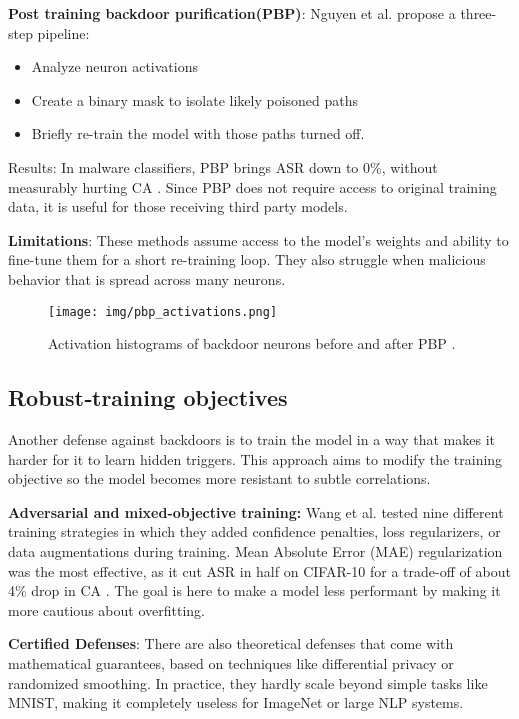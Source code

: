 \documentclass[sigconf,authorversion,nonacm,balance=false]{acmart}
\begin{document}
\textbf{Post training backdoor purification(PBP)}: Nguyen et al.\cite{defense_malware_nguyen_2025} propose a three-step pipeline:
\begin{itemize}
    \item Analyze neuron activations
    \item Create a binary mask to isolate likely poisoned paths
    \item Briefly re-train the model with those paths turned off. 
\end{itemize}
Results: In malware classifiers, PBP brings ASR down to 0\%, without measurably hurting CA \cite{defense_malware_nguyen_2025}. Since PBP does not require access to original training data, it is useful for those receiving third party models. 

\textbf{Limitations}: These methods assume access to the model’s weights and ability to fine-tune them for a short re-training loop. They also struggle when malicious behavior that is spread across many neurons. 


\begin{figure}[t]
  \centering
  \texttt{[image: img/pbp\_activations.png]}
  \caption{Activation histograms of backdoor neurons before and after PBP \cite{defense_malware_nguyen_2025}.}
  \label{fig:pbp-activations}
\end{figure}

\subsection{Robust‑training objectives}
\label{sec:robusttrain}

Another defense against backdoors is to train the model in a way that makes it harder for it to learn hidden triggers. This approach aims to modify the training objective so the model becomes more resistant to subtle correlations.

\textbf{Adversarial and mixed-objective training:} Wang et al.\cite{attack_defense_wang_2023} tested nine different training strategies in which they added confidence penalties, loss regularizers, or data augmentations during training. Mean Absolute Error (MAE) regularization was the most effective, as it cut ASR in half on CIFAR-10 for a trade-off of about 4\% drop in CA \cite{attack_defense_wang_2023}. The goal is here to make a model less performant by making it more cautious about overfitting. 

\textbf{Certified Defenses}: There are also theoretical defenses that come with mathematical guarantees, based on techniques like differential privacy or randomized smoothing. In practice, they hardly scale beyond simple tasks like MNIST, making it completely useless for ImageNet or large NLP systems.
\end{document}
